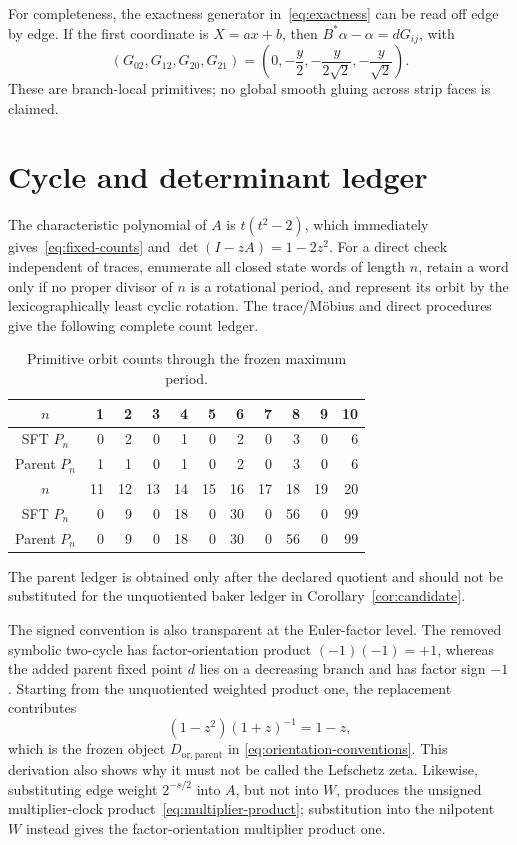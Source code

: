 \documentclass[11pt]{article}
\theoremstyle{definition}
\theoremstyle{remark}
\begin{document}
For completeness, the exactness generator in~\eqref{eq:exactness} can be
read off edge by edge.  If the first coordinate is \(X=a x+b\), then
\(B^*\alpha-\alpha=dG_{ij}\), with
\begin{equation}
 (G_{02},G_{12},G_{20},G_{21})
 =\left(0,-\frac y2,-\frac{y}{2\sqrt2},-\frac{y}{\sqrt2}\right).
 \label{eq:branch-generators}
\end{equation}
These are branch-local primitives; no global smooth gluing across strip faces
is claimed.

\section{Cycle and determinant ledger}
\label{app:cycles}

The characteristic polynomial of \(A\) is \(t(t^2-2)\), which immediately
gives~\eqref{eq:fixed-counts} and
\(\det(I-zA)=1-2z^2\).  For a direct check independent of traces, enumerate
all closed state words of length \(n\), retain a word only if no proper
divisor of \(n\) is a rotational period, and represent its orbit by the
lexicographically least cyclic rotation.  The trace/M\"obius and direct
procedures give the following complete count ledger.
\begin{table}[H]
\centering
\scriptsize
\caption{Primitive orbit counts through the frozen maximum period.}
\label{tab:full-ledger}
\begin{tabular}{c*{10}{r}}
\toprule
\(n\) & 1&2&3&4&5&6&7&8&9&10\\
\midrule
SFT \(P_n\) &0&2&0&1&0&2&0&3&0&6\\
Parent \(P_n\)&1&1&0&1&0&2&0&3&0&6\\
\midrule
\(n\) &11&12&13&14&15&16&17&18&19&20\\
\midrule
SFT \(P_n\)&0&9&0&18&0&30&0&56&0&99\\
Parent \(P_n\)&0&9&0&18&0&30&0&56&0&99\\
\bottomrule
\end{tabular}
\end{table}
The parent ledger is obtained only after the declared quotient and should not
be substituted for the unquotiented baker ledger in
Corollary~\ref{cor:candidate}.

The signed convention is also transparent at the Euler-factor level.  The
removed symbolic two-cycle has factor-orientation product \(({-1})({-1})=+1\),
whereas the added parent fixed point \(d\) lies on a decreasing branch and
has factor sign \(-1\).  Starting from the unquotiented weighted product one,
the replacement contributes
\begin{equation}
 (1-z^2)(1+z)^{-1}=1-z,
 \label{eq:signed-boundary-factor}
\end{equation}
which is the frozen object \(D_{\mathrm{or,parent}}\) in
\eqref{eq:orientation-conventions}.  This derivation also shows why it must
not be called the Lefschetz zeta.  Likewise, substituting edge weight
\(2^{-s/2}\) into \(A\), but not into \(W\), produces the unsigned
multiplier-clock product~\eqref{eq:multiplier-product}; substitution into the
nilpotent \(W\) instead gives the factor-orientation multiplier product one.
\end{document}
